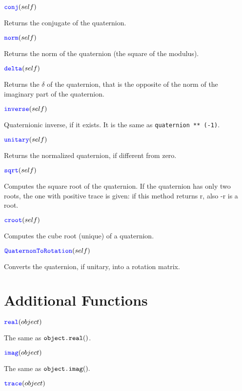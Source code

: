 \documentclass[11pt]{paper}
\begin{document}
\medskip
\noindent $\textcolor{blue}{\texttt{\mbox{conj}}}(self)$ 

Returns the conjugate of the quaternion.

\medskip
\noindent $\textcolor{blue}{\texttt{\mbox{norm}}}(self)$ 

Returns the norm of the quaternion (the square of the modulus).

\medskip
\noindent $\textcolor{blue}{\texttt{\mbox{delta}}}(self)$ 

Returns the $\delta$ of the quaternion, that is the opposite of the norm of the imaginary part of the quaternion.

\medskip
\noindent $\textcolor{blue}{\texttt{\mbox{inverse}}}(self)$ 

Quaternionic inverse, if it exists. It is the same as \texttt{quaternion ** (-1)}.

\medskip
\noindent $\textcolor{blue}{\texttt{\mbox{unitary}}}(self)$ 

Returns the normalized quaternion, if different from zero.

\medskip
\noindent $\textcolor{blue}{\texttt{\mbox{sqrt}}}(self)$ 

Computes the square root of the quaternion. If the quaternion has only two roots, the one with positive trace is given: if this method returns r, also -r is a root.

\medskip
\noindent $\textcolor{blue}{\texttt{\mbox{croot}}}(self)$ 

Computes the cube root (unique) of a quaternion.

\medskip
\noindent $\textcolor{blue}{\texttt{\mbox{QuaternonToRotation}}}(self)$ 

Converts the quaternion, if unitary, into a rotation matrix.

\bigskip

\section{Additional Functions}

\noindent $\textcolor{blue}{\texttt{\mbox{real}}}(object)$ 

The same as $\texttt{\mbox{object.real}}()$.

\medskip
\noindent $\textcolor{blue}{\texttt{\mbox{imag}}}(object)$ 

The same as $\texttt{\mbox{object.imag}}().$

\medskip
\noindent $\textcolor{blue}{\texttt{\mbox{trace}}}(object)$ 
\end{document}
